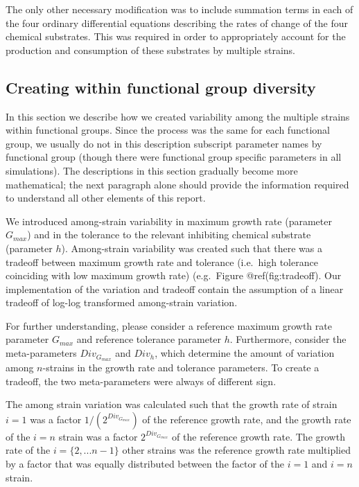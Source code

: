 \documentclass{article}
\begin{document}
The only other necessary modification was to include summation terms in
each of the four ordinary differential equations describing the rates of
change of the four chemical substrates. This was required in order to
appropriately account for the production and consumption of these
substrates by multiple strains.

\hypertarget{creating-within-functional-group-diversity}{%
\subsection{Creating within functional group
diversity}\label{creating-within-functional-group-diversity}}

In this section we describe how we created variability among the
multiple strains within functional groups. Since the process was the
same for each functional group, we usually do not in this description
subscript parameter names by functional group (though there were
functional group specific parameters in all simulations). The
descriptions in this section gradually become more mathematical; the
next paragraph alone should provide the information required to
understand all other elements of this report.

We introduced among-strain variability in maximum growth rate (parameter
\(G_{max}\)) and in the tolerance to the relevant inhibiting chemical
substrate (parameter \(h\)). Among-strain variability was created such
that there was a tradeoff between maximum growth rate and tolerance
(i.e.~high tolerance coinciding with low maximum growth rate)
(e.g.~Figure @ref(fig:tradeoff). Our implementation of the variation and
tradeoff contain the assumption of a linear tradeoff of log-log
transformed among-strain variation.

For further understanding, please consider a reference maximum growth
rate parameter \(G_{max}\) and reference tolerance parameter \(h\).
Furthermore, consider the meta-parameters \(Div_{G_{max}}\) and
\(Div_{h}\), which determine the amount of variation among \(n\)-strains
in the growth rate and tolerance parameters. To create a tradeoff, the
two meta-parameters were always of different sign.

The among strain variation was calculated such that the growth rate of
strain \(i = 1\) was a factor \(1/(2^{Div_{G_{max}}})\) of the reference
growth rate, and the growth rate of the \(i = n\) strain was a factor
\(2^{Div_{G_{max}}}\) of the reference growth rate. The growth rate of
the \(i = \{2,...n-1\}\) other strains was the reference growth rate
multiplied by a factor that was equally distributed between the factor
of the \(i = 1\) and \(i = n\) strain.
\end{document}
